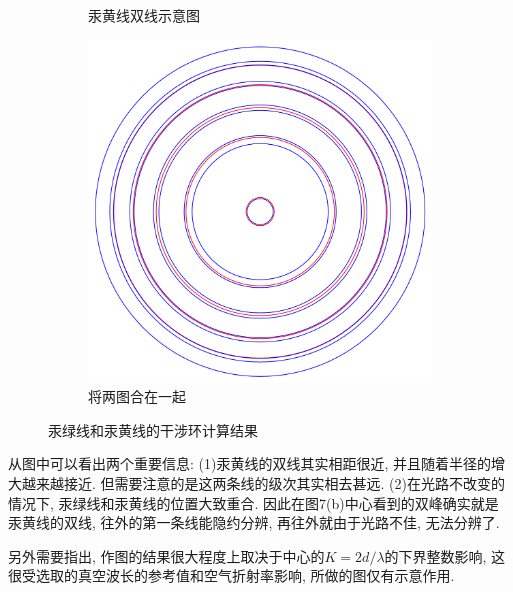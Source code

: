 \documentclass[12pt,a4paper]{article}
\begin{document}
\begin{figure}[H]
\begin{subfigure}[b]{0.32\textwidth}
      \caption{汞黄线双线示意图}
    \end{subfigure}
    \hfill
    \begin{subfigure}[b]{0.32\textwidth}
      \centering
      \includegraphics[width=\textwidth]{calc_yg}
      \caption{将两图合在一起}
    \end{subfigure}
    \caption{汞绿线和汞黄线的干涉环计算结果}
  \end{figure}
从图中可以看出两个重要信息: (1)汞黄线的双线其实相距很近, 并且随着半径的增大越来越接近. 但需要注意的是这两条线的级次其实相去甚远. (2)在光路不改变的情况下, 汞绿线和汞黄线的位置大致重合. 
因此在图7(b)中心看到的双峰确实就是汞黄线的双线, 往外的第一条线能隐约分辨, 再往外就由于光路不佳, 无法分辨了. 

另外需要指出, 作图的结果很大程度上取决于中心的$K=2d/\lambda$的下界整数影响, 这很受选取的真空波长的参考值和空气折射率影响, 所做的图仅有示意作用. 
\end{document}
